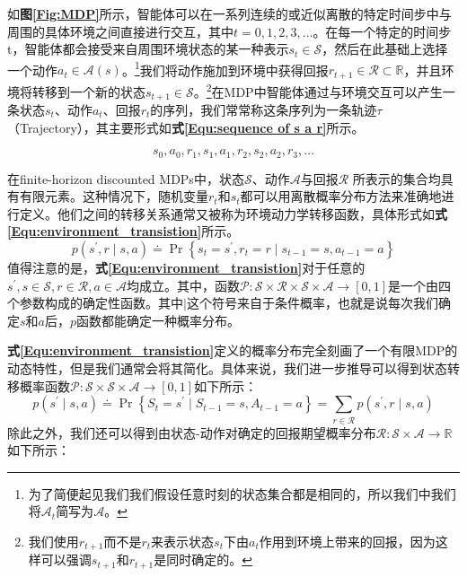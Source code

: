 如\textbf{图\ref{Fig:MDP}}所示，智能体可以在一系列连续的或近似离散的特定时间步中与周围的具体环境之间直接进行交互，其中$t=0,1,2,3,\dots$。在每一个特定的时间步t，智能体都会接受来自周围环境状态的某一种表示$s_t\in \mathcal{S}$，然后在此基础上选择一个动作$a_t\in \mathcal{A}(s)$。\footnote{为了简便起见我们我们假设任意时刻的状态集合都是相同的，所以我们中我们将$\mathcal{A}_t$简写为$\mathcal{A}$。}我们将动作施加到环境中获得回报$r_{t+1}\in\mathcal{R} \subset \mathbb{R}$，并且环境将转移到一个新的状态$s_{t+1}\in \mathcal{S}$。\footnote{我们使用$r_{t+1}$而不是$r_t$来表示状态$s_t$下由$a_t$作用到环境上带来的回报，因为这样可以强调$s_{t+1}$和$r_{t+1}$是同时确定的。}在MDP中智能体通过与环境交互可以产生一条状态$s_t$、动作$a_t$、回报$r_t$的序列，我们常常称这条序列为一条轨迹$\tau$（Trajectory），其主要形式如\textbf{式\eqref{Equ:sequence of s a r}}所示。

\begin{equation}
    \label{Equ:sequence of s a r}
    s_{0}, a_{0}, r_{1}, s_{1}, a_{1}, r_{2}, s_{2}, a_{2}, r_{3}, \ldots
\end{equation}

在finite-horizon discounted MDPs中，状态$\mathcal{S}$、动作$\mathcal{A}$与回报$\mathcal{R}$ 所表示的集合均具有有限元素。这种情况下，随机变量$r_t$和$s_t$都可以用离散概率分布方法来准确地进行定义。他们之间的转移关系通常又被称为环境动力学转移函数，具体形式如\textbf{式\eqref{Equ:environment_transistion}}所示。
\begin{equation}
    \label{Equ:environment_transistion}
    p\left(s^{\prime}, r \mid s, a\right) \doteq \operatorname{Pr}\left\{s_{t}=s^{\prime}, r_{t}=r \mid s_{t-1}=s, a_{t-1}=a\right\}
\end{equation}
值得注意的是，\textbf{式\eqref{Equ:environment_transistion}}对于任意的$s^{\prime},s\in\mathcal{S},r\in\mathcal{R},a\in\mathcal{A}$均成立。其中，函数$\mathcal{P}:\mathcal{S}\times\mathcal{R}\times\mathcal{S}\times\mathcal{A}\rightarrow[0,1]$是一个由四个参数构成的确定性函数。其中$|$这个符号来自于条件概率，也就是说每次我们确定$s$和$a$后，$p$函数都能确定一种概率分布。


\textbf{式\eqref{Equ:environment_transistion}}定义的概率分布完全刻画了一个有限MDP的动态特性，但是我们通常会将其简化。具体来说，我们进一步推导可以得到状态转移概率函数$\mathcal{P}:\mathcal{S} \times \mathcal{S} \times \mathcal{A} \rightarrow [0,1] $如下所示：
\begin{equation}
\label{Equ:state_transistion}
    p\left(s^{\prime} \mid s, a\right) \doteq \operatorname{Pr}\left\{S_{t}=s^{\prime} \mid S_{t-1}=s, A_{t-1}=a\right\}=\sum_{r \in \mathcal{R}} p\left(s^{\prime}, r \mid s, a\right)
\end{equation}
除此之外，我们还可以得到由状态-动作对确定的回报期望概率分布$\mathcal{R}:\mathcal{S}\times\mathcal{A}\rightarrow\mathbb{R}$如下所示：

